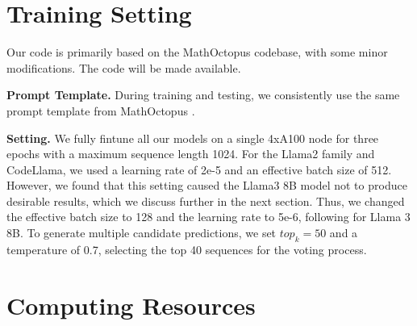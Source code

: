 
























\section{Training Setting}
Our code is primarily based on the MathOctopus codebase, with some minor modifications. The code will be made available.

%
\noindent\textbf{Prompt Template.} During training and testing, we consistently use the same prompt template from MathOctopus \cite{mathoctopus}.

%
\noindent\textbf{Setting.} We fully fintune all our models on a single 4xA100 node for three epochs with a maximum sequence length 1024.
%
For the Llama2 family and CodeLlama, we used a learning rate of 2e-5 and an effective batch size of 512.
%
However, we found that this setting caused the Llama3 8B model not to produce desirable results, which we discuss further in the next section.
%
Thus, we changed the effective batch size to 128 and the learning rate to 5e-6, following \cite{tulu3} for Llama 3 8B.
% 
To generate multiple candidate predictions, we set \( top_k=50 \) and a temperature of 0.7, selecting the top 40 sequences for the voting process.



\section{Computing Resources}

